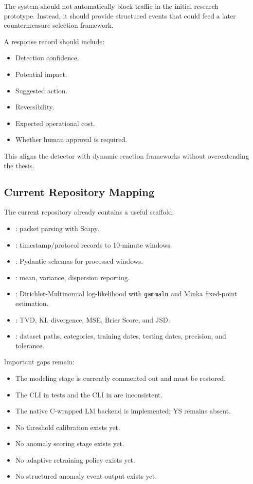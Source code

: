 \documentclass[11pt,a4paper]{article}
\begin{document}
The system should not automatically block traffic in the initial research prototype. Instead, it should provide structured events that could feed a later countermeasure selection framework.

A response record should include:

\begin{itemize}
  \item Detection confidence.
  \item Potential impact.
  \item Suggested action.
  \item Reversibility.
  \item Expected operational cost.
  \item Whether human approval is required.
\end{itemize}

This aligns the detector with dynamic reaction frameworks without overextending the thesis.

\subsection{Current Repository Mapping}

The current repository already contains a useful scaffold:

\begin{itemize}
  \item {}: packet parsing with Scapy.
  \item {}: timestamp/protocol records to 10-minute windows.
  \item {}: Pydantic schemas for processed windows.
  \item {}: mean, variance, dispersion reporting.
  \item {}: Dirichlet-Multinomial log-likelihood with \texttt{gammaln} and Minka fixed-point estimation.
  \item {}: TVD, KL divergence, MSE, Brier Score, and JSD.
  \item {}: dataset paths, categories, training dates, testing dates, precision, and tolerance.
\end{itemize}

Important gaps remain:

\begin{itemize}
  \item The modeling stage is currently commented out and must be restored.
  \item The CLI in tests and the CLI in  are inconsistent.
  \item The native C-wrapped LM backend is implemented; YS remains absent.
  \item No threshold calibration exists yet.
  \item No anomaly scoring stage exists yet.
  \item No adaptive retraining policy exists yet.
  \item No structured anomaly event output exists yet.
\end{itemize}
\end{document}
